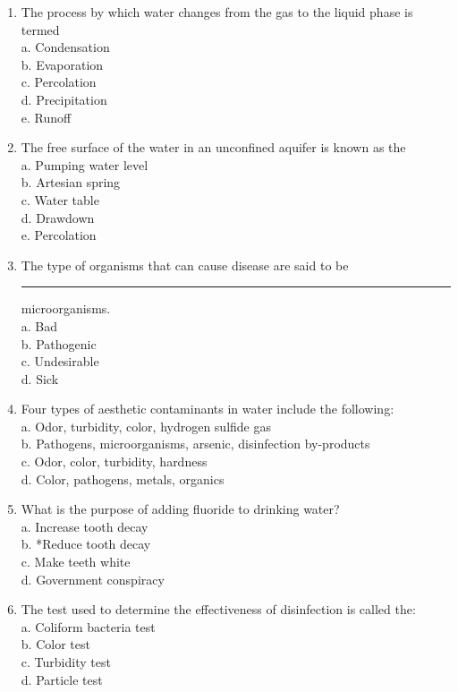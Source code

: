 \documentclass[10pt]{article}
\begin{document}
\begin{enumerate}
\item The process by which water changes from the gas to the liquid phase is termed\\
a.  Condensation\\
b.  Evaporation\\
c.  Percolation\\
d.  Precipitation\\
e.  Runoff\\

\item The free surface of the water in an unconfined aquifer is known as the\\
a.  Pumping water level\\
b.  Artesian spring\\
c.  Water table\\
d.  Drawdown\\
e.  Percolation\\


\item  The type of organisms that can cause disease are said to be \rule{2cm}{0.3pt}
microorganisms.\\
a.  Bad\\
b.  Pathogenic\\
c.  Undesirable\\
d.  Sick\\

\item  Four types of aesthetic contaminants in water include the following:\\
a.  Odor, turbidity, color, hydrogen sulfide gas\\
b.  Pathogens, microorganisms, arsenic, disinfection by-products\\
c.  Odor, color, turbidity, hardness\\
d.  Color, pathogens, metals, organics\\


\item  What is the purpose of adding fluoride to drinking water?\\
a.  Increase tooth decay\\
b.  *Reduce tooth decay\\
c.  Make teeth white\\
d.  Government conspiracy\\

\item  The test used to determine the effectiveness of disinfection is called the:\\
a.  Coliform bacteria test\\
b.  Color test\\
c.  Turbidity test\\
d.  Particle test\\


\end{enumerate}
\end{document}
